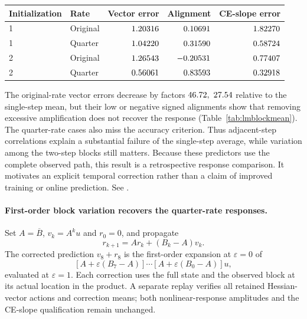 \documentclass[11pt,letterpaper]{article}
\begin{document}
\par\medskip\noindent\begin{minipage}{\linewidth}
\captionsetup{hypcap=false}
\centering\small
\begin{tabular}{@{}llrrr@{}}
\toprule
Initialization & Rate & Vector error & Alignment & CE-slope error \\
\midrule
1 & Original & $1.20316$ & $0.10691$ & $1.82270$ \\
1 & Quarter & $1.04220$ & $0.31590$ & $0.58724$ \\
2 & Original & $1.26543$ & $-0.20531$ & $0.77407$ \\
2 & Quarter & $0.56061$ & $0.83593$ & $0.32918$ \\
\bottomrule
\end{tabular}
\label{tab:lmblockmean}
\end{minipage}\par\medskip

The original-rate vector errors decrease by factors $46.72,\ 27.54$
relative to the single-step mean, but their low or negative signed alignments
show that removing excessive amplification does not recover the response
(Table~\ref{tab:lmblockmean}). The quarter-rate cases also miss the accuracy
criterion. Thus adjacent-step correlations explain a substantial failure of
the single-step average, while variation among the two-step blocks still
matters. Because these predictors use the complete observed path, this result
is a retrospective response comparison. It motivates an explicit temporal
correction rather than a claim of improved training or online prediction.
See .

\paragraph{First-order block variation recovers the quarter-rate responses.}
Set $A=\overline B$, $v_k=A^k u$ and $r_0=0$, and propagate
\[
 r_{k+1}=Ar_k+(B_k-A)v_k.
\]
The corrected prediction $v_8+r_8$ is the first-order expansion at
$\varepsilon=0$ of
\[
 [A+\varepsilon(B_7-A)]\cdots[A+\varepsilon(B_0-A)]u,
\]
evaluated at $\varepsilon=1$. Each correction uses the full state and the
observed block at its actual location in the product. A separate replay
verifies all \nLMFirstOrderActions{} retained Hessian-vector actions and
\nLMFirstOrderMeans{} correction means; both nonlinear-response amplitudes
and the CE-slope qualification remain unchanged.
\end{document}
